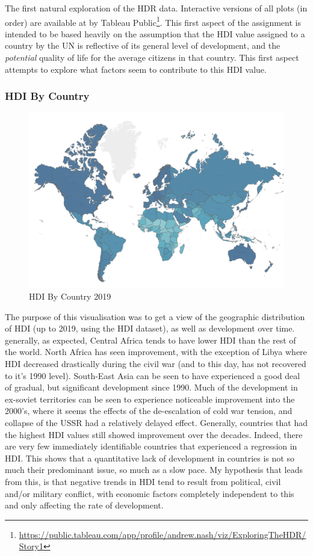 \documentclass[ 10pt ]{fphw}
\begin{document}
\vspace{1cm}

The first natural exploration of the HDR data. Interactive versions of all plots (in order) are available at by Tableau Public\footnote{\url{https://public.tableau.com/app/profile/andrew.nash/viz/ExploringTheHDR/Story1}}. This first aspect of the assignment is intended to be based heavily on the assumption that the HDI value assigned to a country by the UN is reflective of its general level of development, and the \textit{potential} quality of life for the average citizens in that country. This first aspect attempts to explore what factors seem to contribute to this HDI value.

\subsubsection*{HDI By Country}
\begin{center}
\begin{figure}[h!]
    \centering
	\includegraphics[width=0.5\columnwidth]{wmap.png} 
	\caption{HDI By Country 2019}
	\label{fig1:wmap}
	\end{figure}
\end{center}

The purpose of this visualisation was to get a view of the geographic distribution of HDI (up to 2019, using the HDI dataset), as well as development over time. generally, as expected, Central Africa tends to have lower HDI than the rest of the world. North Africa has seen improvement, with the exception of Libya where HDI decreased drastically during the civil war (and to this day, has not recovered to it's 1990 level). South-East Asia can be seen to have experienced a good deal of gradual, but significant development since 1990. Much of the development in ex-soviet territories can be seen to experience noticeable improvement into the 2000's, where it seems the effects of the de-escalation of cold war tension, and collapse of the USSR had a relatively delayed effect. Generally, countries that had the highest HDI values still showed improvement over the decades. Indeed, there are very few immediately identifiable countries that experienced a regression in HDI. This shows that a quantitative lack of development in countries is not so much their predominant issue, so much as a slow pace. My hypothesis that leads from this, is that negative trends in HDI tend to result from political, civil and/or military conflict, with economic factors completely independent to this and only affecting the rate of development.
\end{document}
